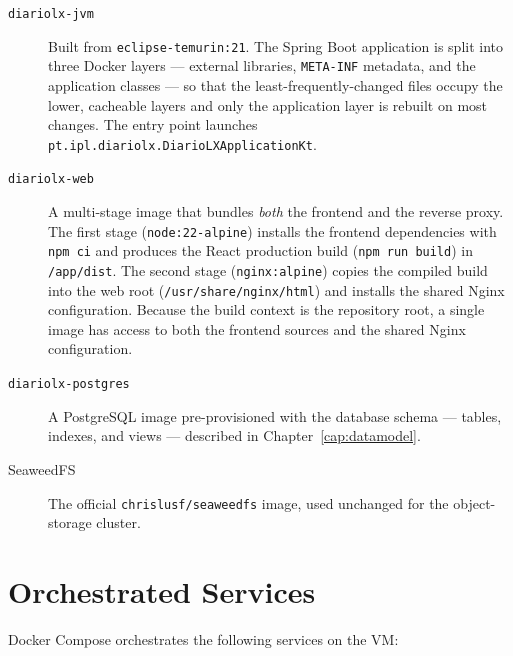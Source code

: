 \begin{description}
      \item[\texttt{diariolx-jvm}] Built from \texttt{eclipse-temurin:21}. The Spring
            Boot application is split into three Docker layers --- external libraries,
            \texttt{META-INF} metadata, and the application classes --- so that the
            least-frequently-changed files occupy the lower, cacheable layers and only
            the application layer is rebuilt on most changes. The entry point launches
            \texttt{pt.ipl.diariolx.DiarioLXApplicationKt}.

      \item[\texttt{diariolx-web}] A multi-stage image that bundles \emph{both} the
            frontend and the reverse proxy. The first stage (\texttt{node:22-alpine})
            installs the frontend dependencies with \texttt{npm ci} and produces the
            React production build (\texttt{npm run build}) in \texttt{/app/dist}. The
            second stage (\texttt{nginx:alpine}) copies the compiled build into the web
            root (\texttt{/usr/share/nginx/html}) and installs the shared Nginx
            configuration. Because
            the build context is the repository root, a single image has access to both
            the frontend sources and the shared Nginx configuration.

      \item[\texttt{diariolx-postgres}] A PostgreSQL image pre-provisioned with the
            database schema --- tables, indexes, and views --- described in
            Chapter~\ref{cap:datamodel}.

      \item[SeaweedFS] The official \texttt{chrislusf/seaweedfs} image, used unchanged
            for the object-storage cluster.
\end{description}

\section{Orchestrated Services} \label{sec:dep_services}

Docker Compose orchestrates the following services on the VM:

